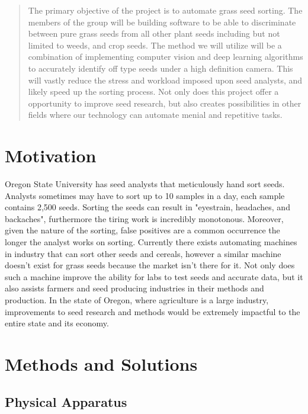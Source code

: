 \documentclass[onecolumn, draftclsnofoot,10pt, compsoc]{IEEEtran}
\begin{document}
\begin{titlepage}
\begin{singlespace}
\begin{abstract}
        	The primary objective of the project is to automate grass seed sorting. The members of the group will be building software to be able to discriminate between pure grass seeds from all other plant seeds including but not limited to weeds, and crop seeds. The method we will utilize will be a combination of implementing computer vision and deep learning algorithms to accurately identify off type seeds under a high definition camera. This will vastly reduce the stress and workload imposed upon seed analysts, and likely speed up the sorting process. Not only does this project offer a opportunity to improve seed research, but also creates possibilities in other fields where our technology can automate menial and repetitive tasks.
        \end{abstract}     
    \end{singlespace}
\end{titlepage}
\newpage
{}
\tableofcontents
\clearpage

\section{Motivation}
Oregon State University has seed analysts that meticulously hand sort seeds. Analysts sometimes may have to sort up to 10 samples in a day, each sample contains 2,500 seeds. Sorting the seeds can result in "eyestrain, headaches, and backaches", furthermore the tiring work is incredibly monotonous. Moreover, given the nature of the sorting, false positives are a common occurrence the longer the analyst works on sorting. Currently there exists automating machines in industry that can sort other seeds and cereals, however a similar machine doesn't exist for grass seeds because the market isn't there for it. Not only does such a machine improve the ability for labs to test seeds and accurate data, but it also assists farmers and seed producing industries in their methods and production. In the state of Oregon, where agriculture is a large industry, improvements to seed research and methods would be extremely impactful to the entire state and its economy. 

\section{Methods and Solutions}

\subsection{Physical Apparatus}
\end{document}
